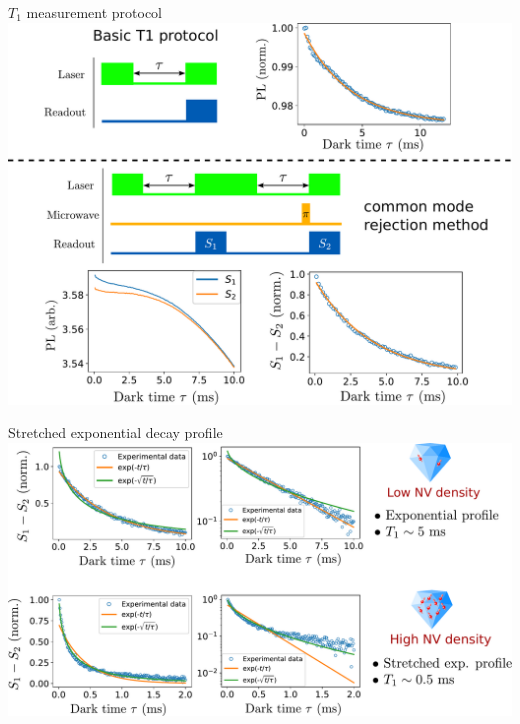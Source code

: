 \documentclass{beamer}
\begin{document}
\begin{frame}{$T_1$ measurement protocol}
\centering
\includegraphics[width=\textwidth,height=0.9\textheight,keepaspectratio]{slide_T1_protocol}
\end{frame}

\begin{frame}{Stretched exponential decay profile}
\centering
\includegraphics[width=\textwidth,height=0.9\textheight,keepaspectratio]{Slide_T1_exp_stretch}
\end{frame}
\end{document}
